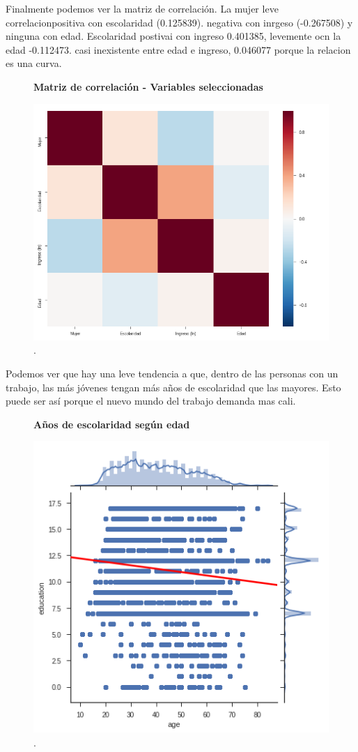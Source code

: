  Finalmente podemos ver la matriz de correlación. La mujer leve correlacionpositiva con escolaridad (0.125839).  negativa con inrgeso (-0.267508) y ninguna con edad. Escolaridad postivai con ingreso 0.401385, levemente ocn la edad -0.112473. casi inexistente entre edad e ingreso, 0.046077 porque la relacion es una curva. 
 
  \begin{figure}[!htb]
  	\centering
  	\textbf{Matriz de correlación - Variables seleccionadas}\par\medskip
  	\includegraphics[scale = 0.4]{../img/capitulo3/corrMatrix.png}
  	\caption{.}
  \end{figure}
  
  Podemos ver que hay una leve tendencia a que, dentro de las personas con un trabajo, las más jóvenes tengan más años de escolaridad que las mayores. Esto puede ser así porque el nuevo mundo del trabajo demanda mas cali.
  
    \begin{figure}[!htb]
    	\centering
    	\textbf{Años de escolaridad según edad}\par\medskip
    	\includegraphics[scale = 0.4]{../img/capitulo3/educVage.png}
    	\caption{.}
    \end{figure}
 
